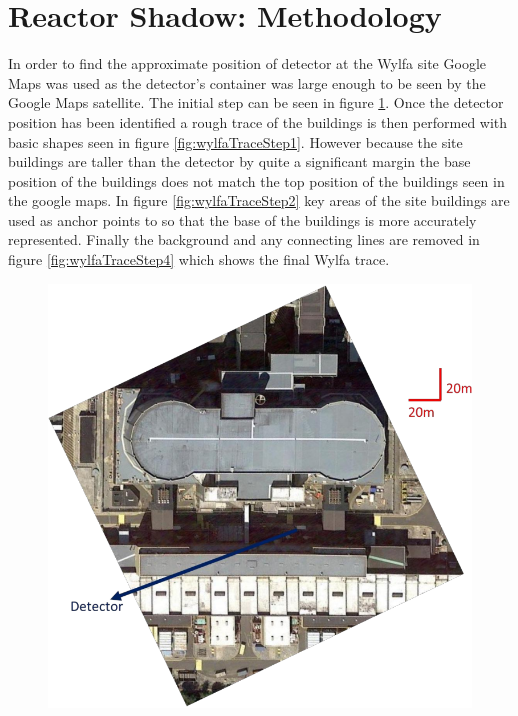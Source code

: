\section{Reactor Shadow: Methodology} \label{sec:ReactorShadowMethodology}
In order to find the approximate position of detector at the Wylfa site Google Maps was used as the detector's container was large enough to be seen by the Google Maps satellite. The initial step can be seen in figure \ref{fig:wylfaTraceStep0}. Once the detector position has been identified a rough trace of the buildings is then performed with basic shapes seen in figure \ref{fig:wylfaTraceStep1}. However because the site buildings are taller than the detector by quite a significant margin the base position of the buildings does not match the top position of the buildings seen in the google maps. In figure \ref{fig:wylfaTraceStep2} key areas of the site buildings are used as anchor points to so that the base of the buildings is more accurately represented. Finally the background and any connecting lines are removed in figure \ref{fig:wylfaTraceStep4} which shows the final Wylfa trace.  
\begin{figure}[H]
 \centering
 \includegraphics[width=\linewidth]{Chapter5/Figs/Raster/wylfaTraceStep0.png}
 \label{fig:wylfaTraceStep0}
\end{figure}

